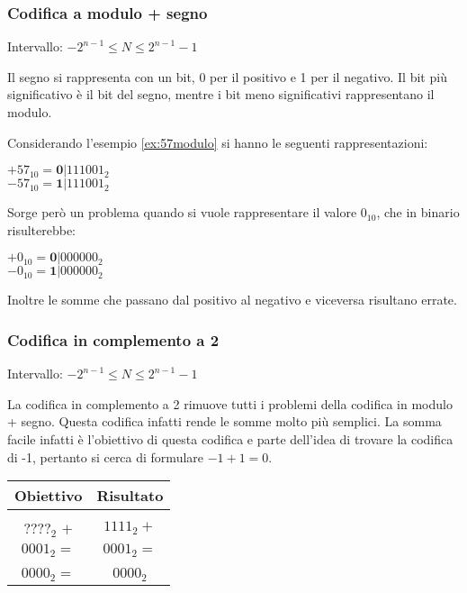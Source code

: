 \documentclass[a4paper]{article}
\theoremstyle{break}
\theoremstyle{break}
\theoremstyle{break}
\theoremstyle{break}
\begin{document}
\subsubsection{Codifica a modulo + segno}
\begin{center}
	Intervallo: \( -2^{n-1} \le N \le 2^{n-1}-1 \)
\end{center}
Il segno si rappresenta con un bit, 0 per il positivo e 1 per il negativo.
Il bit più significativo è il bit del segno, mentre i bit meno significativi
rappresentano il modulo.

\begin{center}
\end{center}
Considerando l'esempio \ref{ex:57modulo} si hanno le seguenti rappresentazioni:

\begin{center}
	\( +57_{10}=\textbf{0}|111001_2 \)\\
	\( -57_{10}=\textbf{1}|111001_2 \)
\end{center}
Sorge però un problema quando si vuole rappresentare il valore \( 0_{10} \),
che in binario risulterebbe:

\begin{center}
	\( +0_{10}=\textbf{0}|000000_2 \)\\
	\( -0_{10}=\textbf{1}|000000_2 \)
\end{center}
Inoltre le somme che passano dal positivo al negativo e viceversa risultano errate.

\subsubsection{Codifica in complemento a 2}
\begin{center}
	Intervallo: \( -2^{n-1} \le N \le 2^{n-1}-1 \)
\end{center}
La codifica in complemento a 2 rimuove tutti i problemi della codifica in modulo
+ segno. Questa codifica infatti rende le somme molto più semplici. La somma facile
infatti è l'obiettivo di questa codifica e parte dell'idea di trovare la
codifica di -1, pertanto si cerca di formulare \( -1+1=0 \).

\begin{center}
	\begin{tabular}{ c|c }
		Obiettivo            & Risultato      \\
		\hline                                \\
		\( ????_2 \) \( + \) & \( 1111_2 + \) \\
		\( 0001_2 = \)       & \( 0001_2 = \) \\ [2ex]
		\hline                                \\
		\( 0000_2 = \)       & \( 0000_2 \)   \\
	\end{tabular}
\end{center}
\end{document}
